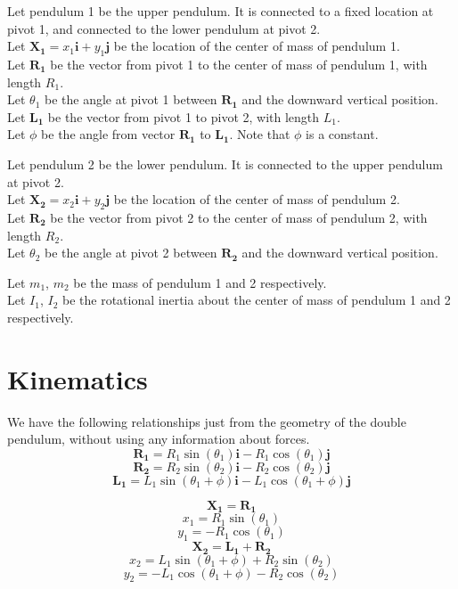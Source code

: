 \documentclass[draft]{article}
\begin{document}
Let pendulum 1 be the upper pendulum.  It is connected to a fixed location at pivot 1, and connected to the lower pendulum at pivot 2.\\
Let $\mathbf{X_1} = x_1 \mathbf{i} + y_1 \mathbf{j}$ be the location of the center of mass of pendulum 1.\\
Let $\mathbf{R_1}$ be the vector from pivot 1 to the center of mass of pendulum 1, with length $R_1$.\\
Let $\theta_1$ be the angle at pivot 1 between $\mathbf{R_1}$ and the downward vertical position.\\
Let $\mathbf{L_1}$ be the vector from pivot 1 to pivot 2, with length $L_1$.\\
Let $\phi$ be the angle from vector $\mathbf{R_1}$ to $\mathbf{L_1}$.  Note that $\phi$ is a constant.

Let pendulum 2 be the lower pendulum.  It is connected to the upper pendulum at pivot 2.\\
Let $\mathbf{X_2} = x_2 \mathbf{i} + y_2 \mathbf{j}$ be the location of the center of mass of pendulum 2.\\
Let $\mathbf{R_2}$ be the vector from pivot 2 to the center of mass of pendulum 2, with length $R_2$.\\
Let $\theta_2$ be the angle at pivot 2 between $\mathbf{R_2}$ and the downward vertical position.

Let $m_1$, $m_2$ be the mass of pendulum 1 and 2 respectively.\\
Let $I_1$, $I_2$ be the rotational inertia about the center of mass of pendulum 1 and 2 respectively.

\section{Kinematics}
We have the following relationships just from the geometry of the double pendulum, without using any information about forces. 
\[
\mathbf{R_1} = R_1 \sin(\theta_1) \mathbf{i} - R_1 \cos(\theta_1) \mathbf{j}
\]
\[
\mathbf{R_2} = R_2 \sin(\theta_2) \mathbf{i} - R_2 \cos(\theta_2) \mathbf{j}
\]
\[
\mathbf{L_1} = L_1 \sin(\theta_1+\phi) \mathbf{i} - L_1 \cos(\theta_1+\phi) \mathbf{j}
\]

\[
\mathbf{X_1} = \mathbf{R_1}
\]
\[
x_1 = R_1 \sin(\theta_1)
\]
\[
y_1 = -R_1 \cos(\theta_1)
\]
\[
\mathbf{X_2} = \mathbf{L_1} + \mathbf{R_2}
\]
\[
x_2 = L_1 \sin(\theta_1+\phi) + R_2 \sin(\theta_2)  
\]
\[
y_2 = -L_1 \cos(\theta_1+\phi) - R_2 \cos(\theta_2) 
\]
\end{document}
